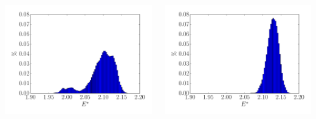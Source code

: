 \documentclass{beamer}
\begin{document}
\begin{frame}
\begin{columns}
\end{columns}
\vspace{-0.7cm}

\begin{columns}
    \begin{column}{6cm}
    \center
    	\includegraphics[scale=0.28]{figures/histo_11240.pdf}
	\end{column}

	\begin{column}{6cm}
	\center
    	\includegraphics[scale=0.28]{figures/histo_11256.pdf}
	\end{column}

\end{columns}

\end{frame}
\end{document}
